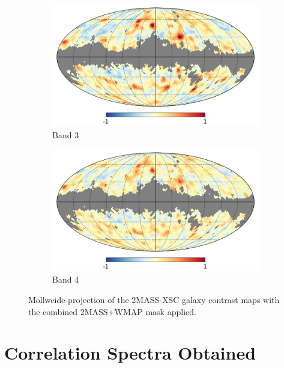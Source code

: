 \documentclass[openany,a4paper,12pt,oneside]{book}
\begin{document}
\begin{spacing}{1.5}
\begin{figure}[!htb]
     \hfill
     \begin{subfigure}[b]{0.495\textwidth}
         \centering
         \includegraphics[width=\textwidth]{Imagens/band3_wmask_xsc.png}
         \caption{Band 3}
         \label{fig:contrast_map3}
     \end{subfigure}
     \hfill
     \begin{subfigure}[b]{0.495\textwidth}
         \centering
         \includegraphics[width=\textwidth]{Imagens/band4_wmask_xsc.png}
         \caption{Band 4}
         \label{fig:contrast_map4}
     \end{subfigure}
        \caption{Mollweide projection of the 2MASS-XSC galaxy contrast maps with the combined 2MASS+WMAP mask applied.}
        \label{fig:2MASS_maps}
\end{figure}

\section{Correlation Spectra Obtained}


\end{spacing}
\end{document}
